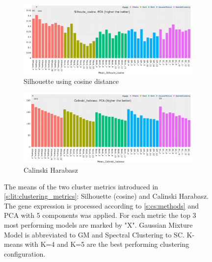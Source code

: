 \begin{figure}[!t]
    \captionsetup[subfigure]{justification=Centering}
    \centering
    \begin{subfigure}[!t]{1.0\textwidth}
        \includegraphics[width=\textwidth,keepaspectratio]{Sections/ClusteringAnalysis/Resources/cs_top3/PCA_top3_Silhoute_cosine.png}
        \caption{Silhouette using cosine distance}
        \label{fig:cs:cosine}
    \end{subfigure}
    \centering
    \begin{subfigure}[!t]{1.0\textwidth}
        \includegraphics[width=\textwidth,keepaspectratio]{Sections/ClusteringAnalysis/Resources/cs_top3/PCA_top3_Calinski_habrasz.png}
        \caption{Calinski Harabasz}
        \label{fig:cs:cal_hab}
    \end{subfigure}
    \caption[Measuring clustering models: Silhouette and Calinski Habrasz]{The means of the two cluster metrics introduced in \cref{s:lit:clustering_metrics}: Silhouette (cosine) and Calinski Harabasz. The gene expression is processed according to \cref{s:cs:methods} and PCA with 5 components was applied. For each metric the top 3 most performing models are marked by "X". Gaussian Mixture Model is abbreviated to GM and Spectral Clustering to SC. K-means with K=4 and K=5 are the best performing clustering configuration.}
    \label{fig:cs:cs_metrics}
\end{figure}



